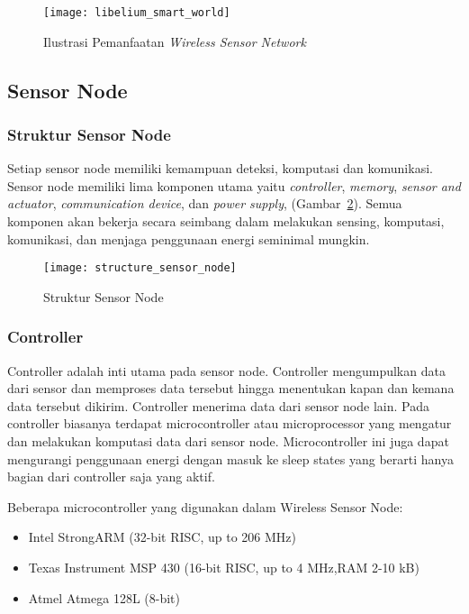 \begin{figure} [H]
	\centering  
	\texttt{[image: libelium\_smart\_world]}  
	\caption[Ilustrasi Pemanfaatan \textit{Wireless Sensor Network}]{Ilustrasi Pemanfaatan \textit{Wireless Sensor Network}} 
	\label{fig:smartworld} 
\end{figure} 

\subsection{Sensor Node}
\subsubsection{Struktur Sensor Node}
Setiap sensor node memiliki kemampuan deteksi, komputasi dan komunikasi. Sensor node memiliki lima komponen utama yaitu \textit{controller}, \textit{memory}, \textit{sensor and actuator}, \textit{communication device}, dan \textit{power supply}, (Gambar~\ref{fig:structure_sensor_node}). Semua komponen akan bekerja secara seimbang dalam melakukan sensing, komputasi, komunikasi, dan menjaga penggunaan energi seminimal mungkin. 

\begin{figure} [H]
	\centering  
	\texttt{[image: structure\_sensor\_node]}  
	\caption[Struktur Sensor Node]{Struktur Sensor Node} 
	\label{fig:structure_sensor_node} 
\end{figure} 

\subsubsection{Controller}
Controller adalah inti utama pada sensor node. Controller mengumpulkan data dari sensor dan memproses data tersebut hingga menentukan kapan dan kemana data tersebut dikirim. Controller menerima data dari sensor node lain. Pada controller biasanya terdapat microcontroller atau microprocessor yang mengatur dan melakukan komputasi data dari sensor node. Microcontroller ini juga dapat mengurangi penggunaan energi dengan masuk ke sleep states yang berarti hanya bagian dari controller saja yang aktif.

Beberapa microcontroller yang digunakan dalam Wireless Sensor Node:
\begin{itemize}
	\item Intel StrongARM (32-bit RISC, up to 206 MHz)
	\item Texas Instrument MSP 430 (16-bit RISC, up to 4 MHz,RAM 2-10 kB)
	\item Atmel Atmega 128L (8-bit)
\end{itemize}

